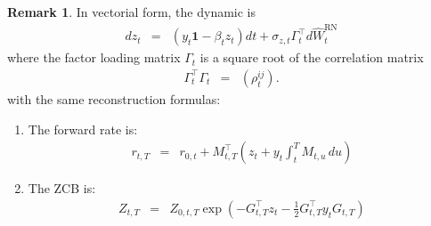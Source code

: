 \documentclass[11pt,english]{amsart}
\newcommand{\vun}{\mathbf{1}}
\newcommand{\RN}{\mathrm{RN}}
\theoremstyle{definition}
\newtheorem{rema}{Remark}
\begin{document}
\begin{rema}
In vectorial form, the dynamic is 
\begin{eqnarray}
  dz_t &=& \left(y_t \vun - \beta_{t} z_t\right)dt + \sigma_{z,t} \Gamma_t^\top d\widehat{W}^\RN_t 
\end{eqnarray}
where the factor loading matrix $\Gamma_t$ is a square root of the correlation matrix
\begin{eqnarray}
  \Gamma_t^\top \Gamma_t &=& (\rho^{ij}_t) .
\end{eqnarray}
with the same reconstruction formulas:
\begin{enumerate}
\item The forward rate is:
\begin{eqnarray}
  r_{t,T} &=& r_{0,t} + M_{t,T}^\top\left( z_t + y_t \int_t^T M_{t,u} \, du \right) 
\end{eqnarray}
\item The ZCB is:
\begin{eqnarray}
  Z_{t,T} &=& Z_{0,t,T} \exp\left( -G_{t,T} ^\top z_t -\frac{1}{2} G_{t,T} ^\top y_t G_{t,T}   \right) 
\end{eqnarray}
\end{enumerate}
\end{rema}


%
%
%
\end{document}
